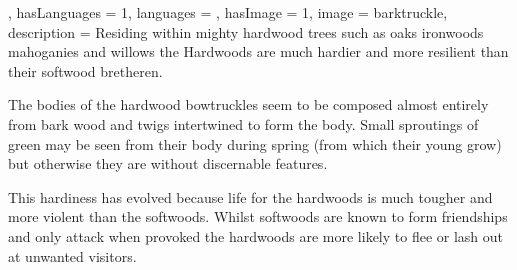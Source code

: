 {{, hasLanguages = 1, languages = , hasImage = 1, image = barktruckle, description = Residing within mighty hardwood trees such as oaks\comma{} ironwoods\comma{} mahoganies and willows\comma{} the Hardwoods are much hardier and more resilient than their softwood bretheren. 

The bodies of the hardwood bowtruckles seem to be composed almost entirely from bark\comma{} wood and twigs intertwined to form the body. Small sproutings of green may be seen from their body during spring (from which their young grow)\comma{} but otherwise they are without discernable features. 

This hardiness has evolved because life for the hardwoods is much tougher and more violent than the softwoods. Whilst softwoods are known to form friendships and only attack when provoked\comma{} the hardwoods are more likely to flee or lash out at unwanted visitors.}

}




